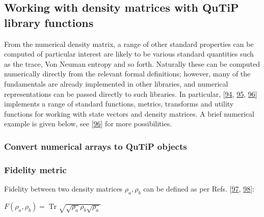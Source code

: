 \documentclass[letterpaper,table,10pt,english]{jupyterBook}
\begin{document}
\subsection{Working with density matrices with QuTiP library functions}
\label{\detokenize{part1/theory_density_matrices_190723:working-with-density-matrices-with-qutip-library-functions}}\label{\detokenize{part1/theory_density_matrices_190723:sect-theory-denmat-qutip}}
\sphinxAtStartPar
From the numerical density matrix, a range of other standard properties can be computed \sphinxhyphen{} of particular interest are likely to be various standard quantities such as the trace, Von Neuman entropy and so forth. Naturally these can be computed numerically directly from the relevant formal definitions; however, many of the fundamentals are already implemented in other libraries, and numerical representations can be passed directly to such libraries. In particular,  {[}\hyperlink{cite.backmatter/bibliography:id689}{94}, \hyperlink{cite.backmatter/bibliography:id690}{95}, \hyperlink{cite.backmatter/bibliography:id813}{96}{]} implements a range of standard functions, metrics, transforms and utility functions for working with state vectors and density matrices. A brief numerical example is given below, see  {[}\hyperlink{cite.backmatter/bibliography:id813}{96}{]} for more possibilities.


\subsubsection{Convert numerical arrays to QuTiP objects}
\label{\detokenize{part1/theory_density_matrices_190723:convert-numerical-arrays-to-qutip-objects}}

\subsubsection{Fidelity metric}
\label{\detokenize{part1/theory_density_matrices_190723:fidelity-metric}}
\sphinxAtStartPar
Fidelity between two density matrices \(\rho_{a},\rho_{b}\) can be defined as per Refs. {[}\hyperlink{cite.backmatter/bibliography:id517}{97}, \hyperlink{cite.backmatter/bibliography:id788}{98}{]}:

\sphinxAtStartPar
\(F(\rho_{a},\rho_{b})=\operatorname{Tr} {\sqrt {{\sqrt {\rho_{a}}}\rho_{b} {\sqrt {\rho_{a}}}}}\)
\end{document}
